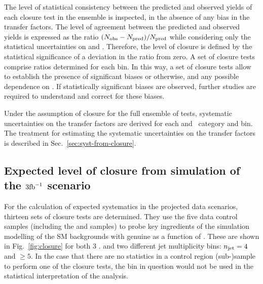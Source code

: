 The level of statistical consistency between the predicted and
observed yields of each closure test in the ensemble is inspected, in
the absence of any bias in the transfer factors. The level of
agreement between the predicted and observed yields is expressed as
the ratio $(\nobs - \npre)/\npre$ while considering only the
statistical uncertainties on \npre and \nobs. Therefore, the level of
closure is defined by the statistical significance of a deviation in
the ratio from zero. A set of closure tests comprise ratios determined
for each \scalht bin. In this way, a set of closure tests allow to
establish the presence of significant biases or otherwise, and any
possible dependence on \scalht. If statistically significant biases
are observed, further studies are required to understand and correct
for these biases.

Under the assumption of closure for the full ensemble of tests,
systematic uncertainties on the transfer factors are derived for each
\njet and \nb~category and \scalht bin. The treatment for
estimating the systematic uncertainties on the transfer factors is
described in Sec.~\ref{sec:syst-from-closure}.

\subsection{Expected level of closure from simulation of the $3\ifb$ scenario}
\label{sec:closure-mc-study}

For the calculation of expected systematics in the projected data scenarios, 
thirteen sets of closure tests are
determined. They use the five data control samples (including the \ej
and \eej samples) to
probe key ingredients of the simulation modelling of the SM
backgrounds with genuine \met as a function of \scalht. These are
shown in Fig.~\ref{fig:closure} for both 3 \ifb.%
and two different jet multiplicity bins: $\njet = 4$ and $\geq 5$. 
In the case that there are no statistics in a control region (sub-)sample
to perform one of the closure tests, the bin in question would not be 
used in the statistical interpretation of the analysis.

